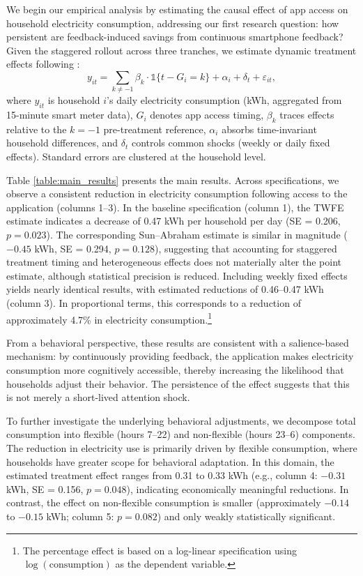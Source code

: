 We begin our empirical analysis by estimating the causal effect of app access on household electricity consumption, addressing our first research question: how persistent are feedback-induced savings from continuous smartphone feedback? Given the staggered rollout across three tranches, we estimate dynamic treatment effects following \citet{sunEstimatingDynamicTreatment2021}:
\[
y_{it} = \sum_{k \neq -1} \beta_k \cdot \mathbb{1}\{t - G_i = k\} + \alpha_i + \delta_t + \varepsilon_{it},
\]
where $y_{it}$ is household $i$'s daily electricity consumption (kWh, aggregated from 15-minute smart meter data), $G_i$ denotes app access timing, $\beta_k$ traces effects relative to the $k=-1$ pre-treatment reference, $\alpha_i$ absorbs time-invariant household differences, and $\delta_t$ controls common shocks (weekly or daily fixed effects). Standard errors are clustered at the household level.

Table \ref{table:main_results} presents the main results. Across specifications, we observe a consistent reduction in electricity consumption following access to the application (columns 1--3). In the baseline specification (column 1), the TWFE estimate indicates a decrease of 0.47 kWh per household per day (SE = 0.206, $p = 0.023$). The corresponding Sun--Abraham estimate is similar in magnitude ($-0.45$ kWh, SE = 0.294, $p = 0.128$), suggesting that accounting for staggered treatment timing and heterogeneous effects does not materially alter the point estimate, although statistical precision is reduced. Including weekly fixed effects yields nearly identical results, with estimated reductions of 0.46--0.47 kWh (column 3). In proportional terms, this corresponds to a reduction of approximately 4.7\% in electricity consumption.\footnote{The percentage effect is based on a log-linear specification using $\log(\text{consumption})$ as the dependent variable.} 

From a behavioral perspective, these results are consistent with a salience-based mechanism: by continuously providing feedback, the application makes electricity consumption more cognitively accessible, thereby increasing the likelihood that households adjust their behavior. The persistence of the effect suggests that this is not merely a short-lived attention shock. 

To further investigate the underlying behavioral adjustments, we decompose total consumption into flexible (hours 7--22) and non-flexible (hours 23--6) components. The reduction in electricity use is primarily driven by flexible consumption, where households have greater scope for behavioral adaptation. In this domain, the estimated treatment effect ranges from 0.31 to 0.33 kWh (e.g., column 4: $-0.31$ kWh, SE = 0.156, $p = 0.048$), indicating economically meaningful reductions. In contrast, the effect on non-flexible consumption is smaller (approximately $-0.14$ to $-0.15$ kWh; column 5: $p = 0.082$) and only weakly statistically significant.



